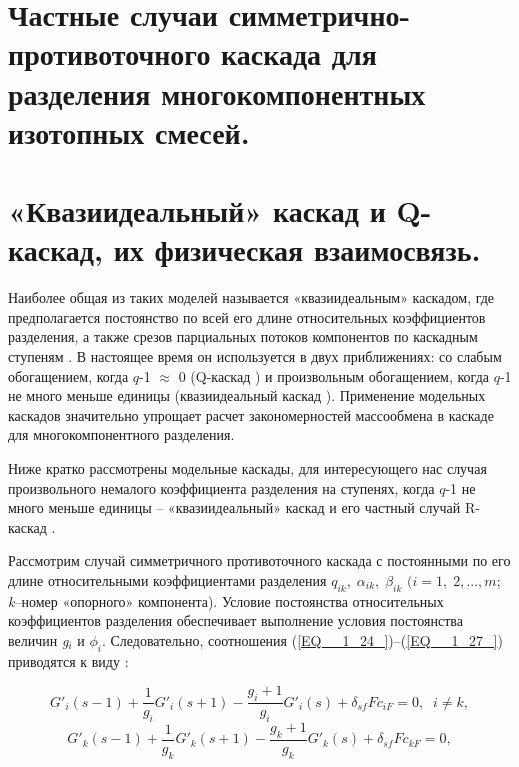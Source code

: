 \section{Частные случаи симметрично-противоточного каскада для разделения многокомпонентных изотопных смесей.}



\section{«Квазиидеальный» каскад и Q-каскад, их физическая взаимосвязь.}

Наиболее общая из таких моделей называется «квазиидеальным» каскадом, где предполагается постоянство по всей его длине относительных коэффициентов разделения, а также срезов парциальных потоков компонентов по каскадным ступеням \cite{yamamotoMulticomponentIsotopeSeparating1978}.
В настоящее время он используется в двух приближениях: со слабым обогащением, когда $q$-1 $\approx$ 0 (Q-каскад \cite{borisevichNewApproachOptimize2011, kolokoltsovDesignCascadesSeparating1970, zengQCascadeExplanation2012}) и произвольным обогащением, когда $q$-1 не много меньше единицы (квазиидеальный каскад \cite{sulaberidzeSpecialFeaturesEnrichment2006}).
Применение модельных каскадов значительно упрощает расчет закономерностей массообмена в каскаде для многокомпонентного разделения.

Ниже кратко рассмотрены модельные каскады, для интересующего нас случая произвольного немалого коэффициента разделения на ступенях, когда $q$-1 не много меньше единицы  -- «квазиидеальный» каскад и его частный случай R-каскад \cite{sazykinKvaziidealnyeKaskadyDlya2000}.


Рассмотрим случай симметричного противоточного каскада с постоянными по его длине относительными коэффициентами разделения $q_{ik} ,\; \alpha _{ik} ,\; \beta _{ik} $ $(i=1,\; 2,...,m;$ \textit{k}--номер «опорного» компонента). Условие постоянства относительных коэффициентов разделения обеспечивает выполнение условия постоянства величин \textit{g${}_{i}$} и $\phi _{i} $. Следовательно, соотношения (\ref{EQ__1_24_})--(\ref{EQ__1_27_}) приводятся к виду \cite{sulaberidzeTeoriyaKaskadovDlya2011}:

\begin{equation} \label{EQ__1_52_} 
  G'_{i} (s-1)+\frac{1}{g_{i} } G'_{i} (s+1)-\frac{g_{i} +1}{g_{i} } G'_{i} (s)+\delta _{sf} Fc_{iF} =0,\; \; i\ne k, 
  \end{equation} 
  \begin{equation} \label{EQ__1_53_} 
  G'_{k} (s-1)+\frac{1}{g_{k} } G'_{k} (s+1)-\frac{g_{k} +1}{g_{k} } G'_{k} (s)+\delta _{sf} Fc_{kF} =0, 
\end{equation}

